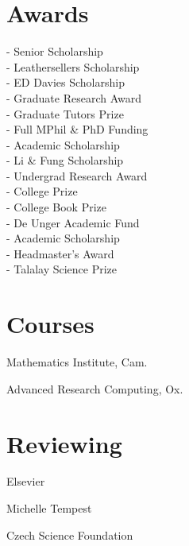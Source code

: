 \documentclass[a4paper]{custom-resume}
\begin{document}
\begin{minipage}[t][0.8\textheight]{0.33\textwidth}


\section{Awards}

\begin{flushleft}
- Senior Scholarship \\
- Leathersellers Scholarship \\
- ED Davies Scholarship \\
- Graduate Research Award \\
- Graduate Tutors Prize \\
- Full MPhil \& PhD Funding \\
- Academic Scholarship \\
- Li \& Fung Scholarship \\
- Undergrad Research Award \\
- College Prize \\
- College Book Prize \\
- De Unger Academic Fund \\
- Academic Scholarship \\
- Headmaster’s Award \\
- Talalay Science Prize
\end{flushleft}


\section{Courses}

\begin{flushleft}
Mathematics Institute, Cam.

Advanced Research Computing, Ox.
\end{flushleft}


\section{Reviewing}

\begin{flushleft}
Elsevier

Michelle Tempest

Czech Science Foundation
\end{flushleft}

\end{minipage}
\end{document}
